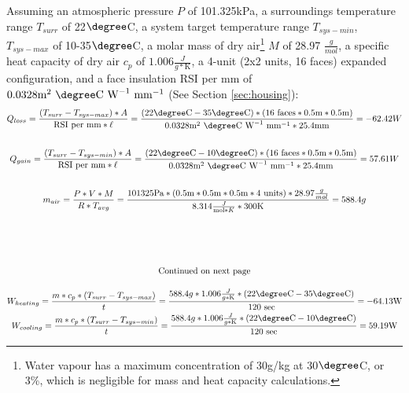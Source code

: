 \documentclass{../tex/report}
\begin{document}
Assuming an atmospheric pressure $P$ of 101.325kPa, a surroundings temperature range $T_{surr}$ of 22$\degree$C, a system target temperature range $T_{sys-min}$, $T_{sys-max}$ of 10-35$\degree$C, a molar mass of dry air\footnote{Water vapour has a maximum concentration of 30g/kg at 30$\degree$C, or 3\%, which is negligible for mass and heat capacity calculations.} $M$ of 28.97 $\frac g{mol}$, a specific heat capacity of dry air $c_p$ of $1.006 \frac{J}{g*\text{K}}$, a 4-unit (2x2 units, 16 faces) expanded configuration, and a face insulation RSI per mm of $0.0328\text{m}^2~  \degree \text{C}~\text{W}^{-1}~\text{mm}^{-1}$ (See Section \ref{sec:housing}):\\
\vspace{.05cm}
\begin{gather*}
    \label{eqn:heatloss}
    Q_{loss}=\frac{(T_{surr}-T_{sys-max}) * A}{\text{RSI per mm} * \ell}=\frac{(22\degree \text{C}-35\degree \text{C}) * (16 \text{ faces} * 0.5\text{m} * 0.5\text{m})}{0.0328 \text{m}^2~  \degree \text{C}~\text{W}^{-1}~\text{mm}^{-1} * 25.4 \text{mm}}=-62.42 W\\\vspace{.05cm}\\
    \label{eqn:heatgain}
    Q_{gain}=\frac{(T_{surr}-T_{sys-min}) * A}{\text{RSI per mm} * \ell}=\frac{(22\degree \text{C}-10\degree \text{C}) * (16 \text{ faces} * 0.5\text{m} * 0.5\text{m})}{0.0328 \text{m}^2~  \degree \text{C}~\text{W}^{-1}~\text{mm}^{-1} * 25.4 \text{mm}}=57.61 W\\\vspace{.05cm}\\
    \label{eqn:airmass}
    m_{air}=\frac{P*V*M}{R*T_{avg}}=\frac{101325\text{Pa}*(0.5\text{m}*0.5\text{m}*0.5\text{m}*4\text{ units})*28.97\frac g{mol}}{8.314\frac{J}{\text{mol}*K}*300\text{K}}=588.4g\\
    \vspace{1.5cm}\\
    \text{Continued on next page}
\end{gather*}
\vspace{1cm}

\begin{gather*}
  \label{eqn:heating}
  W_{heating}=\frac{m*c_p*(T_{surr}-T_{sys-max})}{t}=\frac{588.4g*1.006\frac{J}{g*\text{K}}*(22\degree \text{C}-35\degree \text{C})}{120\text{ sec}}=-64.13\text{W}\\
  \label{eqn:cooling}
  W_{cooling}=\frac{m*c_p*(T_{surr}-T_{sys-min})}{t}=\frac{588.4g*1.006\frac{J}{g*\text{K}}*(22\degree \text{C}-10\degree \text{C})}{120\text{ sec}}=59.19\text{W}
\end{gather*}
\end{document}

